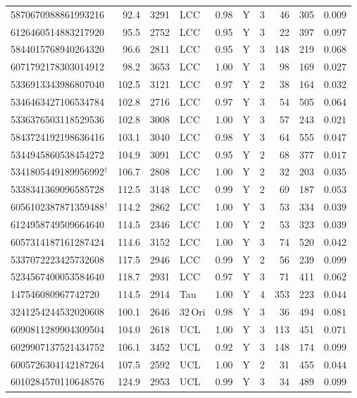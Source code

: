 \begin{longtable}{lrrlrlcrrr}
5870670988861993216 & 92.4 & 3291 & LCC & 0.98 & Y & 3 & 46 & 305 & $0.009$ \\
6126460514883217920 & 95.5 & 2752 & LCC & 0.95 & Y & 3 & 22 & 397 & $0.097$ \\
5844015768940264320 & 96.6 & 2811 & LCC & 0.95 & Y & 3 & 148 & 219 & $0.068$ \\
6071792178303014912 & 98.2 & 3653 & LCC & 1.00 & Y & 3 & 98 & 169 & $0.027$ \\
5336913343986807040 & 102.5 & 3121 & LCC & 0.97 & Y & 2 & 38 & 164 & $0.032$ \\
5346463427106534784 & 102.8 & 2716 & LCC & 0.97 & Y & 3 & 54 & 505 & $0.064$ \\
5336376503118529536 & 102.8 & 3008 & LCC & 1.00 & Y & 3 & 57 & 243 & $0.021$ \\
5843724192198636416 & 103.1 & 3040 & LCC & 0.98 & Y & 3 & 64 & 555 & $0.047$ \\
5344945860538454272 & 104.9 & 3091 & LCC & 0.95 & Y & 2 & 68 & 377 & $0.017$ \\
5341805449189956992$^\dagger$ & 106.7 & 2808 & LCC & 1.00 & Y & 2 & 32 & 203 & $0.035$ \\
5338341369096585728 & 112.5 & 3148 & LCC & 0.99 & Y & 2 & 69 & 187 & $0.053$ \\
6056102387871359488$^\dagger$ & 114.2 & 2862 & LCC & 1.00 & Y & 3 & 53 & 334 & $0.039$ \\
6124958749509664640 & 114.5 & 2346 & LCC & 1.00 & Y & 2 & 53 & 323 & $0.039$ \\
6057314187161287424 & 114.6 & 3152 & LCC & 1.00 & Y & 3 & 74 & 520 & $0.042$ \\
5337072223425732608 & 117.5 & 2946 & LCC & 0.99 & Y & 2 & 56 & 239 & $0.099$ \\
5234567400053584640 & 118.7 & 2931 & LCC & 0.97 & Y & 3 & 71 & 411 & $0.062$ \\
147546080967742720 & 114.5 & 2914 & Tau & 1.00 & Y & 4 & 353 & 223 & $0.044$ \\
3241254244532020608 & 100.1 & 2646 & 32\,Ori & 0.98 & Y & 3 & 36 & 494 & $0.081$ \\
6090811289904309504 & 104.0 & 2618 & UCL & 1.00 & Y & 3 & 113 & 451 & $0.071$ \\
6029907137521434752 & 106.1 & 3452 & UCL & 0.92 & Y & 3 & 148 & 174 & $0.099$ \\
6005726304142187264 & 107.5 & 2592 & UCL & 1.00 & Y & 2 & 31 & 455 & $0.044$ \\
6010284570110648576 & 124.9 & 2953 & UCL & 0.99 & Y & 3 & 34 & 489 & $0.099$ \\

\end{longtable}
